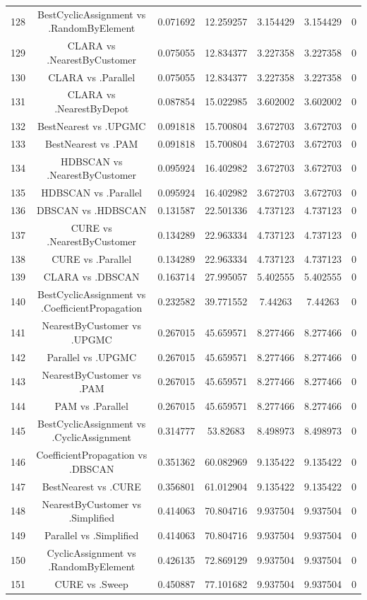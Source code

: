 \documentclass[a4paper,10pt]{article}
\begin{document}
\begin{landscape}
\begin{table}[!htp]
\begin{tabular}{ccccccc}
128&BestCyclicAssignment vs .RandomByElement&0.071692&12.259257&3.154429&3.154429&0\\
129&CLARA vs .NearestByCustomer&0.075055&12.834377&3.227358&3.227358&0\\
130&CLARA vs .Parallel&0.075055&12.834377&3.227358&3.227358&0\\
131&CLARA vs .NearestByDepot&0.087854&15.022985&3.602002&3.602002&0\\
132&BestNearest vs .UPGMC&0.091818&15.700804&3.672703&3.672703&0\\
133&BestNearest vs .PAM&0.091818&15.700804&3.672703&3.672703&0\\
134&HDBSCAN vs .NearestByCustomer&0.095924&16.402982&3.672703&3.672703&0\\
135&HDBSCAN vs .Parallel&0.095924&16.402982&3.672703&3.672703&0\\
136&DBSCAN vs .HDBSCAN&0.131587&22.501336&4.737123&4.737123&0\\
137&CURE vs .NearestByCustomer&0.134289&22.963334&4.737123&4.737123&0\\
138&CURE vs .Parallel&0.134289&22.963334&4.737123&4.737123&0\\
139&CLARA vs .DBSCAN&0.163714&27.995057&5.402555&5.402555&0\\
140&BestCyclicAssignment vs .CoefficientPropagation&0.232582&39.771552&7.44263&7.44263&0\\
141&NearestByCustomer vs .UPGMC&0.267015&45.659571&8.277466&8.277466&0\\
142&Parallel vs .UPGMC&0.267015&45.659571&8.277466&8.277466&0\\
143&NearestByCustomer vs .PAM&0.267015&45.659571&8.277466&8.277466&0\\
144&PAM vs .Parallel&0.267015&45.659571&8.277466&8.277466&0\\
145&BestCyclicAssignment vs .CyclicAssignment&0.314777&53.82683&8.498973&8.498973&0\\
146&CoefficientPropagation vs .DBSCAN&0.351362&60.082969&9.135422&9.135422&0\\
147&BestNearest vs .CURE&0.356801&61.012904&9.135422&9.135422&0\\
148&NearestByCustomer vs .Simplified&0.414063&70.804716&9.937504&9.937504&0\\
149&Parallel vs .Simplified&0.414063&70.804716&9.937504&9.937504&0\\
150&CyclicAssignment vs .RandomByElement&0.426135&72.869129&9.937504&9.937504&0\\
151&CURE vs .Sweep&0.450887&77.101682&9.937504&9.937504&0\\

\end{tabular}
\end{table}
\end{landscape}
\end{document}
